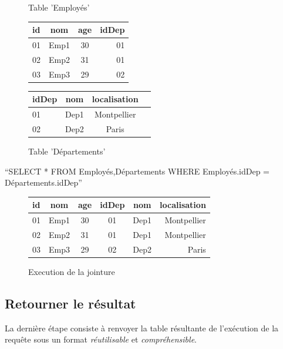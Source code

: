 \documentclass[oneside,13pt,a4paper]{report}
\begin{document}
\begin{figure}[h]
	\begin{minipage}[c]{.46\linewidth}
		\centering
		\caption{Table 'Employés'}
		\begin{tabular}{|l|c|c|r|}
			\hline
			id & nom  & age & idDep
			\\
			\hline
			01 & Emp1 & 30  & 01    \\
			02 & Emp2 & 31  & 01    \\
			03 & Emp3 & 29  & 02    \\
			\hline
		\end{tabular}
	\end{minipage}
	\hfill%
	\begin{minipage}[c]{.46\linewidth}
		\centering
		\caption{Table 'Départements'}
		\begin{tabular}{|l|c|c|r|}
			\hline
			idDep & nom  & localisation
			\\
			\hline
			01    & Dep1 & Montpellier  \\
			02    & Dep2 & Paris        \\
			\hline
		\end{tabular}
	\end{minipage}
\end{figure}

\enquote{SELECT * FROM Employés,Départements WHERE Employés.idDep = Départements.idDep}

\begin{figure}[h]
	\centering
	\caption{Execution de la jointure}
	\begin{tabular}{|l|c|c|c|c|r|}
		\hline
		id & nom  & age & idDep & nom  & localisation
		\\
		\hline
		01 & Emp1 & 30  & 01    & Dep1 & Montpellier  \\
		02 & Emp2 & 31  & 01    & Dep1 & Montpellier  \\
		03 & Emp3 & 29  & 02    & Dep2 & Paris        \\
		\hline
	\end{tabular}
\end{figure}


\subsection{Retourner le résultat}

La dernière étape consiste à renvoyer la table résultante de l'exécution de la requête sous un format \textit{réutilisable} et \textit{compréhensible}.
\end{document}
